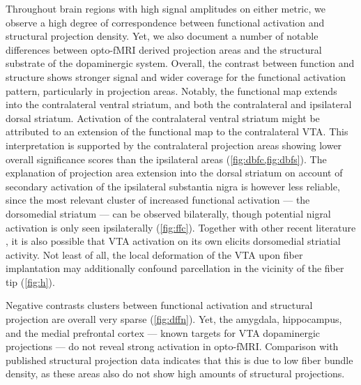Throughout brain regions with high signal amplitudes on either metric, we observe a high degree of correspondence between functional activation and structural projection density.
Yet, we also document a number of notable differences between opto-fMRI derived projection areas and the structural substrate of the dopaminergic system.
Overall, the contrast between function and structure shows stronger signal and wider coverage for the functional activation pattern, particularly in projection areas.
Notably, the functional map extends into the contralateral ventral striatum, and both the contralateral and ipsilateral dorsal striatum.
Activation of the contralateral ventral striatum might be attributed to an extension of the functional map to the contralateral VTA.
This interpretation is supported by the contralateral projection areas showing lower overall significance scores than the ipsilateral areas (\cref{fig:dbfc,fig:dbfs}).
The explanation of projection area extension into the dorsal striatum on account of secondary activation of the ipsilateral substantia nigra is however less reliable, since the most relevant cluster of increased functional activation --- the dorsomedial striatum --- can be observed bilaterally, though potential nigral activation is only seen ipsilaterally (\cref{fig:ffc}).
Together with other recent literature \cite{Lohani2016,Pan2010}, it is also possible that VTA activation on its own elicits dorsomedial striatial activity.
Not least of all, the local deformation of the VTA upon fiber implantation may additionally confound parcellation in the vicinity of the fiber tip (\cref{fig:h}).


Negative contrasts clusters between functional activation and structural projection are overall very sparse (\cref{fig:dffn}).
Yet, the amygdala, hippocampus, and the medial prefrontal cortex --- known targets for VTA dopaminergic projections --- do not reveal strong activation in opto-fMRI.
Comparison with published structural projection data indicates that this is due to low fiber bundle density, as these areas also do not show high amounts of structural projections.

